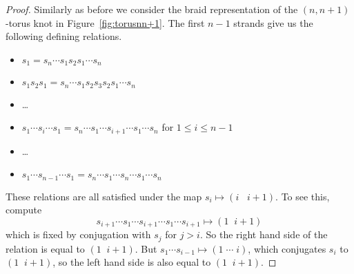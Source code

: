 \documentclass[main.tex]{subfiles}
\begin{document}
\begin{proof} Similarly as before we consider the braid representation of the $(n, n+1)$-torus knot in Figure~\ref{fig:torusnn+1}. The first $n-1$ strands give us the following defining relations.
\begin{itemize}
\setlength\itemsep{0em}
\item $s_1 = s_n \cdots s_1 s_2 s_1 \cdots s_n$
\item $s_1s_2s_1 = s_n \cdots s_1 s_2 s_3 s_2 s_1 \cdots s_n$
\item \dots
\item $s_1 \cdots s_i \cdots s_1 = s_n \cdots s_1 \cdots s_{i+1} \cdots s_1 \cdots s_n$ for $1 \leq i \leq n-1$
\item \dots
\item $s_1 \cdots s_{n-1} \cdots s_1 = s_n \cdots s_1 \cdots s_n \cdots s_1 \cdots s_n$
\end{itemize}
These relations are all satisfied under the map $s_i \mapsto (i \;\;\; i+1)$. To see this, compute 
$$s_{i+1} \cdots s_1 \cdots s_{i+1} \cdots s_1 \cdots s_{i+1} \mapsto (1 \;\; i+1)$$
which is fixed by conjugation with $s_j$ for $j > i$. So the right hand side of the relation is equal to $(1 \; \; i + 1)$. But $s_1 \cdots s_{i-1} \mapsto (1 \; \cdots \; i)$, which conjugates $s_i$ to $(1 \; \; i + 1)$, so the left hand side is also equal to $(1 \; \; i + 1)$. 
\end{proof}
\end{document}
